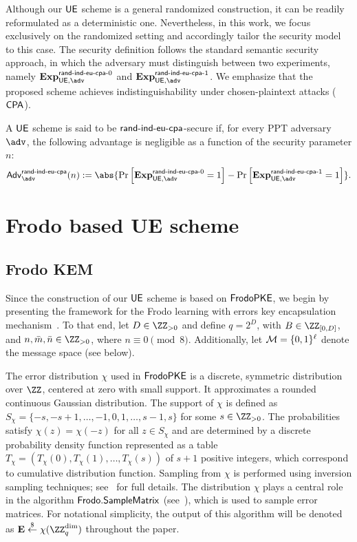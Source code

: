 \documentclass{fundam}
\begin{document}
Although our $\mathsf{UE}$ scheme is a general randomized construction, it can be readily reformulated as a deterministic one. Nevertheless, in this work, we focus exclusively on the randomized setting and accordingly tailor the security model to this case. The security definition follows the standard semantic security approach, in which the adversary must distinguish between two experiments, namely $\Exp{\UE,\adv}{\EUmod{0}}$ and $\Exp{\UE,\adv}{\EUmod{1}}$. We emphasize that the proposed scheme achieves indistinguishability under chosen-plaintext attacks ($\mathsf{CPA}$).

\noindent A $\mathsf{UE}$ scheme is said to be $\mathsf{rand}{\text{-}}\mathsf{ind}{\text{-}}\mathsf{eu}{\text{-}}\mathsf{cpa}$-secure if, for every PPT adversary $\adv$, the following advantage is negligible as a function of the security parameter $n$:
\begin{align*}
	\Adv_{\adv}^{\EUS}(n) := \abs{\Pr\left[ \Exp{\UE,\adv}{\EUmod{0}} = 1 \right] - \Pr\left[ \Exp{\UE,\adv}{\EUmod{1}} = 1 \right]}.
\end{align*}



\section{Frodo based UE scheme}
\subsection{Frodo KEM}\label{sec::Frodo}
Since the construction of our $\mathsf{UE}$ scheme is based on $\mathsf{FrodoPKE}$, we begin by presenting the framework for the Frodo learning with errors key encapsulation mechanism~\cite{Frodo, Frodo2}. To that end, let $D \in \ZZ_{>0}$ and define $q = 2^D$, with $B \in \ZZ_{[0, D]}$, and $n, \bar{m}, \bar{n} \in \ZZ_{>0}$, where $n \equiv 0 \pmod{8}$. Additionally, let $\mathcal{M} = \{0,1\}^{\ell}$ denote the message space (see below).


The error distribution $\chi$ used in $\mathsf{FrodoPKE}$ is a discrete, symmetric distribution over $\ZZ$, centered at zero with small support. It approximates a rounded continuous Gaussian distribution. The support of $\chi$ is defined as $S_{\chi} = \{-s, -s+1, \ldots, -1, 0, 1, \ldots, s-1, s\}$ for some $s \in \ZZ_{>0}$. The probabilities satisfy $\chi(z) = \chi(-z)$ for all $z \in S_{\chi}$ and are determined by a discrete probability density function represented as a table $T_{\chi} = (T_{\chi}(0), T_{\chi}(1), \ldots, T_{\chi}(s))$ of $s+1$ positive integers, which correspond to cumulative distribution function. Sampling from $\chi$ is performed using inversion sampling techniques; see~\cite{Frodo, Frodo2} for full details.
The distribution $\chi$ plays a central role in the algorithm $\mathsf{Frodo.SampleMatrix}$ (see~\cite{Frodo, Frodo2}), which is used to sample error matrices. For notational simplicity, the output of this algorithm will be denoted as $\vr{E} \sample \chi(\ZZ_q^{\dim})$ throughout the paper.
%
\end{document}
